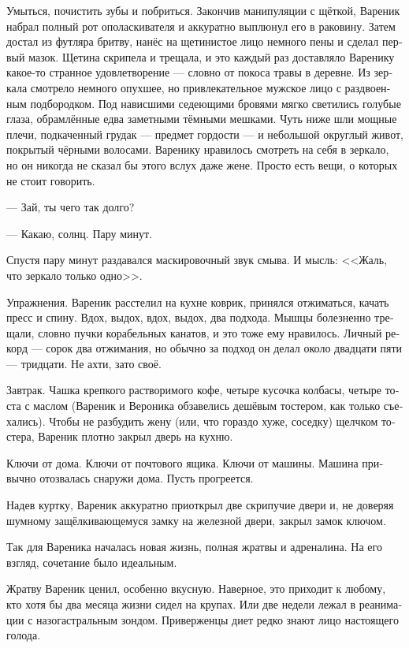 \documentclass[a5paper,12pt,fleqn]{extbook}\usepackage{cooltooltips}\usepackage{polyglossia}\setdefaultlanguage[babelshorthands=true]{russian}\setotherlanguage{english}\defaultfontfeatures{Ligatures=TeX,Mapping=tex-text} \usepackage{xcolor}\definecolor{lightgray}{HTML}{bbbbbb}\color{lightgray}\newcommand{\ml}[3]{\textenglish{\textcolor{black}{#3}}}
\newcommand{\asterism}{\vspace{1em}{\centering\Large\bfseries$\ast~\ast~\ast$\par}\vspace{1em}}
\begin{document}
Умыться, почистить зубы и побриться.
Закончив манипуляции с щёткой, Вареник набрал полный рот ополаскивателя и аккуратно выплюнул его в раковину.
Затем достал из футляра бритву, нанёс на щетинистое лицо немного пены и сделал первый мазок.
Щетина скрипела и трещала, и это каждый раз доставляло Варенику какое-то странное удовлетворение --- словно от покоса травы в деревне.
Из зеркала смотрело немного опухшее, но привлекательное мужское лицо с раздвоенным подбородком.
Под нависшими седеющими бровями мягко светились голубые глаза, обрамлённые едва заметными тёмными мешками.
Чуть ниже шли мощные плечи, подкаченный грудак --- предмет гордости --- и небольшой округлый живот, покрытый чёрными волосами.
Варенику нравилось смотреть на себя в зеркало, но он никогда не сказал бы этого вслух даже жене.
Просто есть вещи, о которых не стоит говорить.

--- Зай, ты чего так долго?

--- Какаю, солнц.
Пару минут.

Спустя пару минут раздавался маскировочный звук смыва.
И мысль:
<<Жаль, что зеркало только одно>>.

Упражнения.
Вареник расстелил на кухне коврик, принялся отжиматься, качать пресс и спину.
Вдох, выдох, вдох, выдох, два подхода.
Мышцы болезненно трещали, словно пучки корабельных канатов, и это тоже ему нравилось.
Личный рекорд --- сорок два отжимания, но обычно за подход он делал около двадцати пяти --- тридцати.
Не ахти, зато своё.

Завтрак.
Чашка крепкого растворимого кофе, четыре кусочка колбасы, четыре тоста с маслом (Вареник и Вероника обзавелись дешёвым тостером, как только съехались).
Чтобы не разбудить жену (или, что гораздо хуже, соседку) щелчком тостера, Вареник плотно закрыл дверь на кухню.

Ключи от дома.
Ключи от почтового ящика.
Ключи от машины.
Машина привычно отозвалась снаружи дома.
Пусть прогреется.

Надев куртку, Вареник аккуратно приоткрыл две скрипучие двери и, не доверяя шумному защёлкивающемуся замку на железной двери, закрыл замок ключом.

\asterism

Так для Вареника началась новая жизнь, полная жратвы и адреналина.
На его взгляд, сочетание было идеальным.

Жратву Вареник ценил, особенно вкусную.
Наверное, это приходит к любому, кто хотя бы два месяца жизни сидел на крупах.
Или две недели лежал в реанимации с назогастральным зондом.
Приверженцы диет редко знают лицо настоящего голода.
\end{document}
